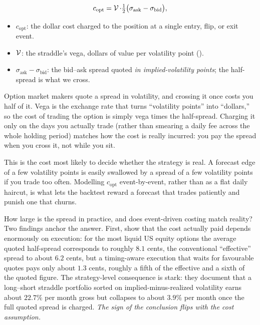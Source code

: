 \begin{equation}
\label{eq:ivrv:vega-cost}
c_{\text{opt}} = \operatorname{\mathcal{V}} \cdot \tfrac{1}{2}\big(\sigma_{\text{ask}} - \sigma_{\text{bid}}\big),
\end{equation}
\begin{itemize}
  \item $c_{\text{opt}}$: the dollar cost charged to the position at a single entry, flip, or exit event.
  \item $\operatorname{\mathcal{V}}$: the straddle's vega, dollars of value per volatility point ().
  \item $\sigma_{\text{ask}} - \sigma_{\text{bid}}$: the bid--ask spread quoted \emph{in implied-volatility points}; the half-spread is what we cross.
\end{itemize}

\begin{intuition}
Option market makers quote a spread in volatility, and crossing it once costs you half of it. Vega is the exchange rate that turns ``volatility points'' into ``dollars,'' so the cost of trading the option is simply vega times the half-spread. Charging it only on the days you actually trade (rather than smearing a daily fee across the whole holding period) matches how the cost is really incurred: you pay the spread when you cross it, not while you sit.
\end{intuition}

\begin{projectconnection}
This is the cost most likely to decide whether the strategy is real. A forecast edge of a few volatility points is easily swallowed by a spread of a few volatility points if you trade too often. Modelling $c_{\text{opt}}$ event-by-event, rather than as a flat daily haircut, is what lets the backtest reward a forecast that trades patiently and punish one that churns.
\end{projectconnection}

How large is the spread in practice, and does event-driven costing match reality? Two findings anchor the answer. First, \citet{MuravyevPearson2020} show that the cost actually paid depends enormously on execution: for the most liquid US equity options the average quoted half-spread corresponds to roughly $8.1$ cents, the conventional ``effective'' spread to about $6.2$ cents, but a timing-aware execution that waits for favourable quotes pays only about $1.3$ cents, roughly a fifth of the effective and a sixth of the quoted figure. The strategy-level consequence is stark: they document that a long--short straddle portfolio sorted on implied-minus-realized volatility earns about $22.7\%$ per month gross but collapses to about $3.9\%$ per month once the full quoted spread is charged. \emph{The sign of the conclusion flips with the cost assumption.}

